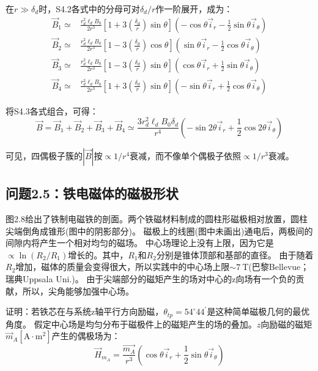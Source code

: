 在$r\gg \delta_d$时，S4.2各式中的分母可对$\delta_d/r$作一阶展开，成为：
\begin{align}
\vec{B}_1 \simeq& \frac{r_d^2 \ell_d B_0}{2 r^3}\left[1+3\left(\frac{\delta_d}{r}\right)\sin\theta \right](-\cos\theta \vec{i}_r-\frac{1}{2}\sin\theta \vec{i}_\theta)\nonumber\tag{S4.3a}\\
\vec{B}_2 \simeq& \frac{r_d^2 \ell_d B_0}{2 r^3}\left[1-3\left(\frac{\delta_d}{r}\right)\cos\theta \right](\sin\theta \vec{i}_r-\frac{1}{2}\cos\theta \vec{i}_\theta)\nonumber\tag{S4.3b}\\
\vec{B}_3 \simeq& \frac{r_d^2 \ell_d B_0}{2 r^3}\left[1-3\left(\frac{\delta_d}{r}\right)\sin\theta \right](\cos\theta \vec{i}_r+\frac{1}{2}\sin\theta \vec{i}_\theta)\nonumber\tag{S4.3c}\\
\vec{B}_4 \simeq& \frac{r_d^2 \ell_d B_0}{2 r^3}\left[1+3\left(\frac{\delta_d}{r}\right)\sin\theta \right](-\sin\theta \vec{i}_r+\frac{1}{2}\cos\theta \vec{i}_\theta)\nonumber\tag{S4.3d}
\end{align}

将S4.3各式组合，可得：
\begin{equation*}
\vec{B}=\vec{B}_1+\vec{B}_2+\vec{B}_3+\vec{B}_4\simeq \frac{3r_d^2 \ell_d B_0 \delta_d}{r^4}(-\sin 2\theta \vec{i}_r+\frac{1}{2}\cos 2\theta \vec{i}_\theta) \tag{2.52}
\end{equation*}

可见，四偶极子簇的$|\vec{B}|$按$\propto 1/r^4$衰减，而不像单个偶极子依照$\propto 1/r^3$衰减。


\subsection{问题2.5：铁电磁体的磁极形状}
图2.8给出了铁制电磁铁的剖面。两个铁磁材料制成的圆柱形磁极相对放置，圆柱尖端倒角成锥形(图中的阴影部分)。
磁极上的线圈(图中未画出)通电后，两极间的间隙内将产生一个相对均匀的磁场。
中心场理论上没有上限，因为它是$\propto \ln(R_2/R_1)$增长的。其中，$R_1$和$R_2$分别是锥体顶部和基部的直径。
由于随着$R_2$增加，磁体的质量会变得很大，所以实践中的中心场上限$\sim 7\ \mathrm{T}$(巴黎Bellevue；瑞典Uppsala Uni.)。
由于尖端部分的磁矩产生的场对中心的z向场有一个负的贡献，所以，尖角能够加强中心场。

证明：若铁芯在与系统z轴平行方向励磁，$\theta_{tp}=54^\circ 44^\prime$是这种简单磁极几何的最优角度。
假定中心场是均匀分布于磁极件上的磁矩产生的场的叠加。$z$向励磁的磁矩$\vec{m}_A [\mathrm{A\cdot m^2}]$产生的偶极场为：
\begin{equation}
\vec{H}_{m_A}=\frac{\vec{m_A}}{r^3}(\cos\theta \vec{i}_r+\frac{1}{2}\sin\theta\vec{i}_\theta)
\end{equation}

